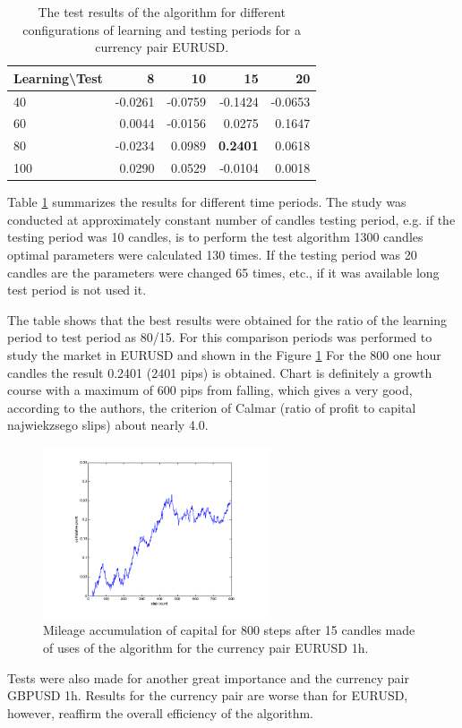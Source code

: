 \documentclass[runningheads,a4paper]{llncs}
\begin{document}
\begin{table}[h!]
\centering
\caption{The test results of the algorithm for different configurations of learning and testing periods for a currency pair EURUSD.}
\label{tab:tab1}
\begin{tabular}{|l|r|r|r|r|} \hline
Learning\textbackslash Test &	8	 &	10 &		15	 &	20 \\ \hline
40 &		-0.0261 &		-0.0759	 &	-0.1424	 &	-0.0653 \\ \hline
60 &		0.0044 &		-0.0156 &		0.0275 &		0.1647 \\ \hline
80 &		-0.0234 &		0.0989 &		\textbf{0.2401} &		0.0618 \\ \hline
100	 &	0.0290 &		0.0529 &		-0.0104	 &	0.0018 \\ \hline
\end{tabular}
\end{table}
\FloatBarrier
Table \ref{tab:tab1} summarizes the results for different time periods. The study was conducted at approximately constant number of candles testing period, e.g. if the testing period was 10 candles, is to perform the test algorithm 1300 candles optimal parameters were calculated 130 times. If the testing period was 20 candles are the parameters were changed 65 times, etc., if it was available long test period is not used it.

The table shows that the best results were obtained for the ratio of the learning period to test period as 80/15. For this comparison periods was performed to study the market in EURUSD and shown in the Figure \ref{fig:fig8} For the 800 one hour candles the result 0.2401 (2401 pips) is obtained. Chart is definitely a growth course with a maximum of 600 pips from falling, which gives a very good, according to the authors, the criterion of Calmar (ratio of profit to capital najwiekzsego slips) about nearly 4.0.\\

\begin{figure}[h!]
\centering
\includegraphics[width = 0.6\textwidth]{figures/rys8.png}
\caption{Mileage accumulation of capital for 800 steps after 15 candles made of uses of the algorithm for the currency pair EURUSD 1h.}
\label{fig:fig8}
\end{figure}
\FloatBarrier
\vspace{-1em}
Tests were also made for another great importance and the currency pair GBPUSD 1h. Results for the currency pair are worse than for EURUSD, however, reaffirm the overall efficiency of the algorithm.\\
\end{document}
